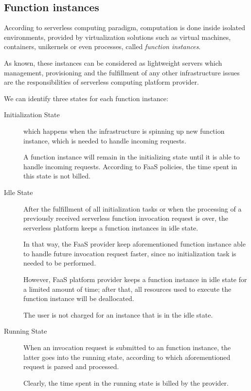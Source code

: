 \documentclass[12pt,a4paper]{report}
\begin{document}
\subsection{Function instances}

According to serverless computing paradigm, computation is done inside isolated environments, provided by virtualization solutions such as virtual machines, containers, unikernels or even processes, called \textit{function instances}.

As known, these instances can be considered as lightweight servers which management, provisioning and the fulfillment of any other infrastructure issues are the responsibilities of serverless computing platform provider.

We can identify three states for each function instance:

\begin{description}
	
	\item[Initialization State] which happens when the infrastructure is spinning up new function instance, which is needed to handle incoming requests. 
	
	A function instance will remain in the initializing state until it is able to handle incoming requests. According to FaaS policies, the time spent in this state is not billed. 
	
	\item[Idle State] After the fulfillment of all initialization tasks or when the processing of a previously received serverless function invocation request is over, the serverless platform keeps a function instances in idle state.
	
	In that way, the FaaS provider keep aforementioned function instance able to handle future invocation request faster, since no initialization task is needed to be performed.
	
	However, FaaS platform provider keeps a function instance in idle state for a limited amount of time; after that, all resources used to execute the function instance will be deallocated.
	
	The user is not charged for an instance that is in the idle state.
	
	\item[Running State] When an invocation request is submitted to an function instance, the latter goes into the running state, according to which aforementioned request is parsed and processed.
	
	Clearly, the time spent in the running state is billed by the provider.
	
\end{description}
\end{document}
